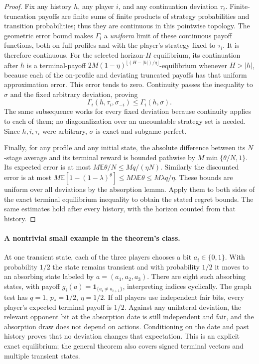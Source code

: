 \documentclass[11pt,a4paper]{article}
\newcommand{\E}{\mathbb E}
\newcommand{\ind}{\mathbf 1}
\theoremstyle{definition}
\theoremstyle{remark}
\begin{document}
\begin{proof}
Fix any history $h$, any player $i$, and any continuation deviation $\tau_i$. Finite-truncation payoffs are finite sums of finite products of strategy probabilities and transition probabilities; thus they are continuous in this pointwise topology. The geometric error bound makes $\Gamma_i$ a \emph{uniform} limit of these continuous payoff functions, both on full profiles and with the player's strategy fixed to $\tau_i$. It is therefore continuous. For the selected horizon-$H$ equilibrium, its continuation after $h$ is a terminal-payoff $2M(1-\eta)^{\lfloor(H-|h|)/q\rfloor}$-equilibrium whenever $H>|h|$, because each of the on-profile and deviating truncated payoffs has that uniform approximation error. This error tends to zero. Continuity passes the inequality to $\sigma$ and the fixed arbitrary deviation, proving
\[
 \Gamma_i(h,\tau_i,\sigma_{-i})\leq\Gamma_i(h,\sigma).
\]
The same subsequence works for every fixed deviation because continuity applies to each of them; no diagonalization over an uncountable strategy set is needed. Since $h,i,\tau_i$ were arbitrary, $\sigma$ is exact and subgame-perfect.

Finally, for any profile and any initial state, the absolute difference between its $N$-stage average and its terminal reward is bounded pathwise by $M\min\{\theta/N,1\}$. Its expected error is at most $M\E\theta/N\leq Mq/(\eta N)$. Similarly the discounted error is at most
$M\E[1-(1-\lambda)^\theta]\leq M\lambda\E\theta\leq M\lambda q/\eta$.
These bounds are uniform over all deviations by the absorption lemma. Apply them to both sides of the exact terminal equilibrium inequality to obtain the stated regret bounds. The same estimates hold after every history, with the horizon counted from that history.
\end{proof}

\paragraph{A nontrivial small example in the theorem's class.}
At one transient state, each of the three players chooses a bit $a_i\in\{0,1\}$. With probability $1/2$ the state remains transient and with probability $1/2$ it moves to an absorbing state labeled by $a=(a_1,a_2,a_3)$. There are eight such absorbing states, with payoff
$g_i(a)=\ind_{\{a_i\ne a_{i+1}\}}$, interpreting indices cyclically. The graph test has $q=1$, $p_*=1/2$, $\eta=1/2$. If all players use independent fair bits, every player's expected terminal payoff is $1/2$. Against any unilateral deviation, the relevant opponent bit at the absorption date is still independent and fair, and the absorption draw does not depend on actions. Conditioning on the date and past history proves that no deviation changes that expectation. This is an explicit exact equilibrium; the general theorem also covers signed terminal vectors and multiple transient states.
\end{document}
